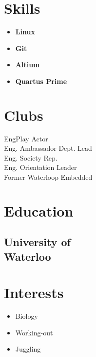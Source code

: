 \documentclass[]{chandan-cv}
\begin{document}
\begin{minipage}[t]{0.23\textwidth}

\section{Skills}
	\begin{itemize}
		\setlength\itemsep{-0.17em}
		\item \textbf{Linux}
		\item \textbf{Git}
		\item \textbf{Altium}
		\item \textbf{Quartus Prime}
	\end{itemize}

\section{Clubs}
EngPlay Actor \\
Eng. Ambassador Dept. Lead \\
Eng. Society Rep.\\
Eng. Orientation Leader \\
Former Waterloop Embedded

\section{Education}

\subsection{University of \\
Waterloo}

\section{Interests}
\begin{itemize}
	\setlength\itemsep{-0.3em}
	\item Biology
	\item Working-out
	\item Juggling
\end{itemize}
\sectionsep


%
%

\end{minipage}
\end{document}
